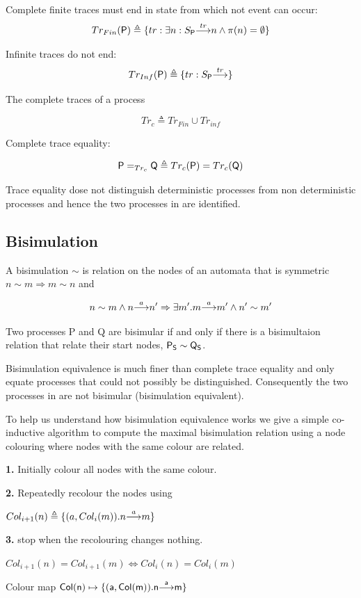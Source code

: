 \documentclass[]{article}
\begin{document}
 Complete finite traces must end in state from which not event can occur:
 \[Tr_{Fin}({\sf P}) \triangleq \{ tr : \exists n : {S_{\sf P} }{\stackrel{tr}{\longrightarrow}}{n} \land \pi(n)=\emptyset\}\]

 Infinite traces  do not end:
 \[Tr_{Inf}({\sf P}) \triangleq \{ tr :  {S_{\sf P} }{\stackrel{tr}{\longrightarrow}}{} \}\]

 The  complete traces of a process

 \[Tr_c \triangleq Tr_{Fin}\cup Tr_{inf}\]

 Complete trace equality:

 \[{\sf P} =_{Tr_c} {\sf Q} \triangleq Tr_c({\sf P}) = Tr_c({\sf Q})\]

Trace equality dose not distinguish deterministic processes from non deterministic processes  and hence the two processes in  are identified.
 \subsection{Bisimulation}\label{sec:biscol}
  A bisimulation  $\sim$ is relation on the nodes of an automata  that is  symmetric  $n\sim m\Rightarrow m\sim n$  and

 \[ n\sim m \land {n}{\stackrel{a}{\longrightarrow}}{n'} \Rightarrow \exists m' . {m}{\stackrel{a}{\longrightarrow}}{m'}  \land n'\sim m' \]

 Two processes {\sf P} and {\sf Q} are bisimular if and only if there is a bisimultaion relation that relate their start nodes, ${\sf P_S\sim Q_S}$.

 Bisimulation equivalence is much finer than complete trace equality and  only equate processes that could not possibly be distinguished.
 Consequently the two processes in  are not bisimular (bisimulation equivalent).

 To help us understand how bisimulation equivalence works we give a simple co-inductive algorithm to compute the maximal  bisimulation relation  using a node colouring where  nodes with the same colour  are related.

\begin{center}\begin{minipage}{0.7\textwidth}

 {\bf 1.} Initially colour all nodes with the same colour.

{\bf 2.} Repeatedly recolour the nodes using
     \begin{center}
     $Col_{i+1}(n) \triangleq \{(a,Col_i(m)) .{n}{\stackrel{a}{\longrightarrow}}{m} \}$
     
     \end{center}

{\bf 3.} \hspace{0.25in} stop when  the recolouring changes nothing.
\begin{center}
     $Col_{i+1}(n) =Col_{i+1}(m) \Leftrightarrow Col_{i}(n) =Col_{i}(m)$
 
      {\sf Colour map} $\sf Col(n) \mapsto \{(a,Col(m)) .{n}{\stackrel{a}{\longrightarrow}}{m} \}$
     \end{center}

\end{minipage} \end{center}
\end{document}
